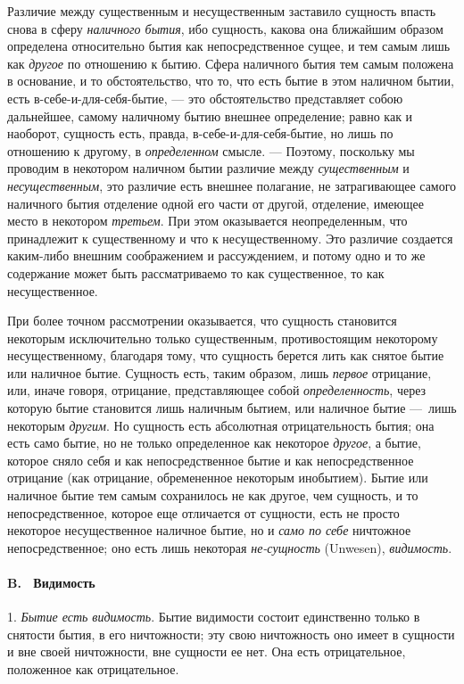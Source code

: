 Различие между существенным и несущественным заставило сущность впасть снова
в сферу {\em наличного бытия}, ибо сущность, какова она
ближайшим образом определена относительно бытия как непосредственное сущее,
и тем самым лишь как {\em другое} по отношению к бытию.
Сфера наличного бытия тем самым положена в основание, и то обстоятельство,
что то, что есть бытие в этом наличном бытии, есть в-себе-и-для-себя-бытие,
— это обстоятельство представляет собою дальнейшее, самому наличному бытию
внешнее определение; равно как и наоборот, сущность есть, правда,
в-себе-и-для-себя-бытие, но лишь по отношению к другому, в
{\em определенном} смысле. — Поэтому, поскольку мы
проводим в некотором наличном бытии различие между
{\em существенным} и
{\em несущественным}, это различие есть внешнее
полагание, не затрагивающее самого наличного бытия отделение одной его
части от другой, отделение, имеющее место в некотором
{\em третьем}. При этом оказывается неопределенным, что
принадлежит к существенному и что к несущественному. Это различие создается
каким-либо внешним соображением и рассуждением, и потому одно и то же
содержание может быть рассматриваемо то как существенное, то как
несущественное.

При более точном рассмотрении оказывается, что сущность становится некоторым
исключительно только существенным, противостоящим некоторому
несущественному, благодаря тому, что сущность берется лить как снятое бытие
или наличное бытие. Сущность есть, таким образом, лишь
{\em первое} отрицание, или, иначе говоря, отрицание,
представляющее собой {\em определенность}, через
которую бытие становится лишь наличным бытием, или наличное бытие —~лишь
некоторым {\em другим}. Но сущность есть абсолютная
отрицательность бытия; она есть само бытие, но не только определенное как
некоторое {\em другое}, а бытие, которое сняло себя и
как непосредственное бытие и как непосредственное отрицание (как отрицание,
обремененное некоторым инобытием). Бытие или наличное бытие тем самым
сохранилось не как другое, чем сущность, и то непосредственное, которое еще
отличается от сущности, есть не просто некоторое несущественное наличное
бытие, но и {\em само по себе} ничтожное
непосредственное; оно есть лишь некоторая
{\em не-сущность} (Unwesen),
{\em видимость}. 

\paragraph[B. \ Видимость]{B. \ Видимость}
1. {\em Бытие есть
видимость}. Бытие видимости состоит единственно только в снятости бытия, в
его ничтожности; эту свою ничтожность оно имеет в сущности и вне своей
ничтожности, вне сущности ее нет. Она есть отрицательное, положенное как
отрицательное.

